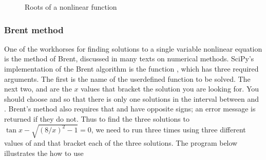 \documentclass[letterpaper,10pt,english]{sphinxmanual}
\begin{document}
\begin{figure}[htbp]
\centering
\capstart

\noindent{}
\caption{Roots of a nonlinear function}\label{\detokenize{chap9/chap9_scipy:id4}}\label{\detokenize{chap9/chap9_scipy:fig-rootdemo}}\end{figure}

\ignorespaces 

\subsubsection{Brent method}
\label{\detokenize{chap9/chap9_scipy:brent-method}}\label{\detokenize{chap9/chap9_scipy:index-12}}
\sphinxAtStartPar
One of the workhorses for finding solutions to a single variable nonlinear equation is the method of Brent, discussed in many texts on numerical methods.  SciPy’s implementation of the Brent algorithm is the function , which has three required arguments.  The first  is the name of the user\sphinxhyphen{}defined function to be solved.  The next two,  and  are the \(x\) values that bracket the solution you are looking for.  You should choose  and  so that there is only one solutions in the interval between  and .  Brent’s method also requires that  and  have opposite signs; an error message is returned if they do not.  Thus to find the three solutions to \(\tan x - \sqrt{(8/x)^2-1} = 0\), we need to run  three times using three different values of  and  that bracket each of the three solutions.  The program below illustrates the how to use 
\end{document}

